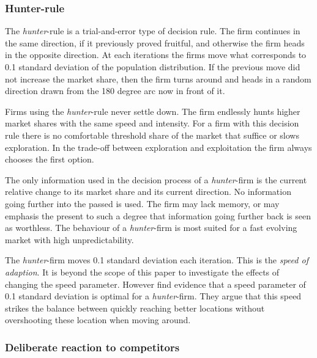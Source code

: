 \documentclass[preprint, 12pt]{elsarticle}
\begin{document}
\subsubsection{Hunter-rule}

The \emph{hunter}-rule is a trial-and-error type of decision rule. The firm continues in the same direction, if it previously proved fruitful, and otherwise the firm heads in the opposite direction. At each iterations the firms move what corresponds to 0.1 standard deviation of the population distribution. If the previous move did not increase the market share, then the firm turns around and heads in a random direction drawn from the 180 degree arc now in front of it. 

Firms using the \emph{hunter}-rule never settle down. The firm endlessly hunts higher market shares with the same speed and intensity. For a firm with this decision rule there is no comfortable threshold share of the market that suffice or slows exploration. In the trade-off between exploration and exploitation the firm always chooses the first option. 

The only information used in the decision process of a \emph{hunter}-firm is the current relative change to its market share and its current direction. No information going further into the passed is used. The firm may lack memory, or may emphasis the present to such a degree that information going further back is seen as worthless. The behaviour of a \emph{hunter}-firm is most suited for a fast evolving market with high unpredictability.

The \emph{hunter}-firm moves 0.1 standard deviation each iteration. This is the \emph{speed of adaption}. It is beyond the scope of this paper to investigate the effects of changing the speed parameter. However \citet[chapter~7, pp.~150-151]{Laver_Sergenti_2011} find evidence that a speed parameter of 0.1 standard deviation is optimal for a \emph{hunter}-firm. They argue that this speed strikes the balance between quickly reaching better locations without overshooting these location when moving around. 

\subsubsection{Deliberate reaction to competitors}
\end{document}
